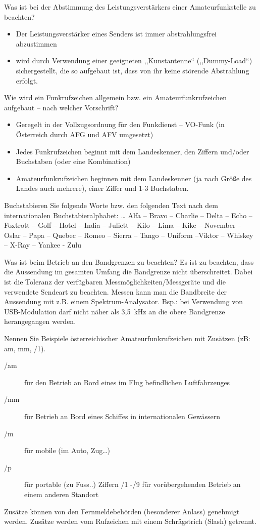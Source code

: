\documentclass[avery5371,grid,frame,a4paper]{flashcards}
\newcommand{\card}[3]{
  \begin{flashcard}[{\chap} -- #1]{#2}#3\end{flashcard}
}
\begin{document}
\card{49}{Was ist bei der Abstimmung des Leistungsverstärkers einer Amateurfunkstelle zu beachten?}{
  \begin{itemize}
    \item Der Leistungsverstärker eines Senders ist immer abstrahlungsfrei abzustimmen
    \item wird durch Verwendung einer geeigneten ,,Kunstantenne`` (,,Dummy-Load``) sichergestellt, die so aufgebaut ist, dass von ihr keine störende Abstrahlung erfolgt.
  \end{itemize}
}
\card{50}{Wie wird ein Funkrufzeichen allgemein bzw. ein Amateurfunkrufzeichen aufgebaut – nach welcher Vorschrift?}{
  \begin{itemize}
    \item Geregelt in der Vollzugsordnung für den Funkdienst – VO-Funk (in Österreich durch AFG und AFV umgesetzt)
    \item Jedes Funkrufzeichen beginnt mit dem Landeskenner, den Ziffern und/oder Buchstaben (oder eine Kombination)
    \item Amateurfunkrufzeichen beginnen mit dem Landeskenner (ja nach Größe des Landes auch mehrere), einer Ziffer und 1-3 Buchstaben.
  \end{itemize}
}
\card{51}{Buchstabieren Sie folgende Worte bzw. den folgenden Text nach dem internationalen Buchstabieralphabet: \dots}{
  Alfa – Bravo – Charlie – Delta – Echo – Foxtrott – Golf – Hotel – India – Juliett – Kilo – Lima – Kike – November – Oslar – Papa – Quebec – Romeo – Sierra – Tango – Uniform –Viktor – Whiskey – X-Ray – Yankee - Zulu
}
\card{52}{Was ist beim Betrieb an den Bandgrenzen zu beachten?}{
  Es ist zu beachten, dass die Aussendung im gesamten Umfang die Bandgrenze nicht überschreitet. Dabei ist die Toleranz der verfügbaren Messmöglichkeiten/Messgeräte und die verwendete Sendeart zu beachten. Messen kann man die Bandbreite der Aussendung mit z.B. einem Spektrum-Analysator.
  Bsp.: bei Verwendung von USB-Modulation darf nicht näher als 3,5~kHz an die obere Bandgrenze herangegangen werden.
}
\card{53}{Nennen Sie Beispiele österreichischer Amateurfunkrufzeichen mit Zusätzen (zB: am, mm, /1).}{
  \footnotesize
  \begin{description}
    \item[/am] für den Betrieb an Bord eines im Flug befindlichen Luftfahrzeuges
    \item[/mm] für Betrieb an Bord eines Schiffes in internationalen Gewässern
    \item[/m] für mobile (im Auto, Zug…)
    \item[/p] für portable (zu Fuss..)  Ziffern /1 -/9 für vorübergehenden Betrieb an einem anderen Standort
  \end{description}
  Zusätze können von den Fernmeldebehörden (besonderer Anlass) genehmigt werden.
  Zusätze werden vom Rufzeichen mit einem Schrägstrich (Slash) getrennt.
}
\end{document}
